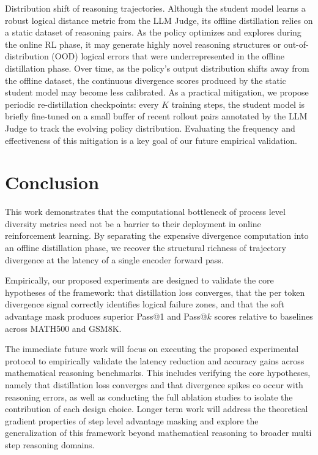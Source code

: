 \documentclass[conference]{IEEEtran}
\begin{document}
Distribution shift of reasoning trajectories. Although the student model learns a robust logical distance metric from the LLM Judge, its offline distillation relies on a static dataset of reasoning pairs. As the policy optimizes and explores during the online RL phase, it may generate highly novel reasoning structures or out-of-distribution (OOD) logical errors that were underrepresented in the offline distillation phase. Over time, as the policy's output distribution shifts away from the offline dataset, the continuous divergence scores produced by the static student model may become less calibrated. As a practical mitigation, we propose periodic re-distillation checkpoints: every $K$ training steps, the student model is briefly fine-tuned on a small buffer of recent rollout pairs annotated by the LLM Judge to track the evolving policy distribution. Evaluating the frequency and effectiveness of this mitigation is a key goal of our future empirical validation.

\section{Conclusion}

This work demonstrates that the computational bottleneck of process level diversity metrics need not be a barrier to their deployment in online reinforcement learning. By separating the expensive divergence computation into an offline distillation phase, we recover the structural richness of trajectory divergence at the latency of a single encoder forward pass.

Empirically, our proposed experiments are designed to validate the core hypotheses of the framework: that distillation loss converges, that the per token divergence signal correctly identifies logical failure zones, and that the soft advantage mask produces superior Pass@1 and Pass@$k$ scores relative to baselines across MATH500 and GSM8K.

The immediate future work will focus on executing the proposed experimental protocol to empirically validate the latency reduction and accuracy gains across mathematical reasoning benchmarks. This includes verifying the core hypotheses, namely that distillation loss converges and that divergence spikes co occur with reasoning errors, as well as conducting the full ablation studies to isolate the contribution of each design choice. Longer term work will address the theoretical gradient properties of step level advantage masking and explore the generalization of this framework beyond mathematical reasoning to broader multi step reasoning domains.
\end{document}
